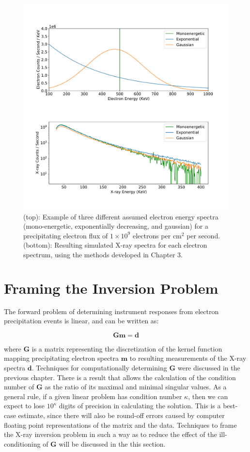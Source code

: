 \begin{figure}[p]
\label{why_ill_conditioned}
\centering
\includegraphics[width=1.0\textwidth]{figures/chapter_4/why_ill_conditioned/fig.pdf}
\caption{(top): Example of three different assumed electron energy spectra (mono-energetic, exponentially decreasing, and gaussian) for a precipitating electron flux of $1\times10^9$ electrons per $\mbox{cm}^2$ per second. (bottom): Resulting simulated X-ray spectra for each electron spectrum, using the methods developed in Chapter 3.} 
\end{figure}

\section{Framing the Inversion Problem}

The forward problem of determining instrument responses from electron precipitation events is linear, and can be written as:

$$\mathbf{G}\mathbf{m} = \mathbf{d}$$

where $\mathbf{G}$ is a matrix representing the discretization of the kernel function mapping precipitating electron spectra $\mathbf{m}$ to resulting measurements of the X-ray spectra $\mathbf{d}$. Techniques for computationally determining $\mathbf{G}$ were discussed in the previous chapter. There is a result that allows the calculation of the condition number of $\mathbf{G}$ as the ratio of its maximal and minimal singular values. As a general rule, if a given linear problem has condition number $\kappa$, then we can expect to lose $10^\kappa$ digits of precision in calculating the solution. This is a best-case estimate, since there will also be round-off errors caused by computer floating point representations of the matrix and the data. Techniques to frame the X-ray inversion problem in such a way as to reduce the effect of the ill-conditioning  of $\mathbf{G}$ will be discussed in the this section.

